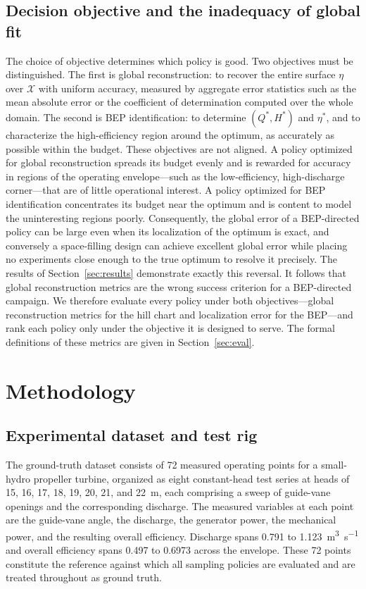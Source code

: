 \documentclass[preprint,12pt]{elsarticle}
\begin{document}
\subsection{Decision objective and the inadequacy of global fit}
The choice of objective determines which policy is good. Two objectives must be
distinguished. The first is global reconstruction: to recover the entire surface
$\eta$ over $\mathcal{X}$ with uniform accuracy, measured by aggregate error
statistics such as the mean absolute error or the coefficient of determination
computed over the whole domain. The second is BEP identification: to determine
$(Q^\ast, H^\ast)$ and $\eta^\ast$, and to characterize the high-efficiency region
around the optimum, as accurately as possible within the budget. These objectives are
not aligned. A policy optimized for global reconstruction spreads its budget evenly
and is rewarded for accuracy in regions of the operating envelope---such as the
low-efficiency, high-discharge corner---that are of little operational interest. A
policy optimized for BEP identification concentrates its budget near the optimum and
is content to model the uninteresting regions poorly. Consequently, the global error
of a BEP-directed policy can be large even when its localization of the optimum is
exact, and conversely a space-filling design can achieve excellent global error while
placing no experiments close enough to the true optimum to resolve it precisely. The
results of Section~\ref{sec:results} demonstrate exactly this reversal. It follows
that global reconstruction metrics are the wrong success criterion for a BEP-directed
campaign. We therefore evaluate every policy under both objectives---global
reconstruction metrics for the hill chart and localization error for the BEP---and
rank each policy only under the objective it is designed to serve. The formal
definitions of these metrics are given in Section~\ref{sec:eval}.

\section{Methodology}\label{sec:method}

\subsection{Experimental dataset and test rig}
The ground-truth dataset consists of 72 measured operating points for a small-hydro
propeller turbine, organized as eight constant-head test series at heads of 15, 16,
17, 18, 19, 20, 21, and \SI{22}{\metre}, each comprising a sweep of guide-vane
openings and the corresponding discharge. The measured variables at each point are the
guide-vane angle, the discharge, the generator power, the mechanical power, and the
resulting overall efficiency. Discharge spans 0.791 to
\SI{1.123}{\cubic\metre\per\second} and overall efficiency spans 0.497 to 0.6973
across the envelope. These 72 points constitute the reference against which all
sampling policies are evaluated and are treated throughout as ground truth.
\end{document}
